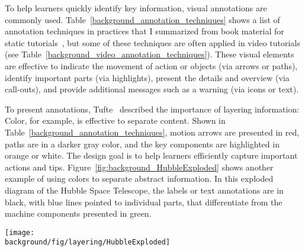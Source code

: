 To help learners quickly identify key information, visual annotations are commonly used. Table~\ref{background_annotation_techniques} shows a list of annotation techniques in practices that I summarized from book material for static tutorials~\cite{mijksenaar1999open,greenberg2012sketching,Buxton:2007:SUE:1526229,tufte1990envisioning}, but some of these techniques are often applied in video tutorials (see Table~\ref{background_video_annotation_techniques}).
%
These visual elements are effective to indicate the movement of action or objects (via arrows or paths), identify important parts (via highlights), present the details and overview (via call-outs), and provide additional messages such as a warning (via icons or text).

To present annotations, Tufte~\cite{tufte1990envisioning} described the importance of layering information: 
%
Color, for example, is effective to separate content. Shown in Table~\ref{background_annotation_techniques}, motion arrows are presented in red, paths are in a darker gray color, and the key components are highlighted in orange or white. The design goal is to help learners efficiently capture important actions and tips.
%
Figure~\ref{fig:background_HubbleExploded} shows another example of using colors to separate abstract information. In this exploded diagram of the Hubble Space Telescope, the labels or text annotations are in black, with blue lines pointed to individual parts, that differentiate from the machine components presented in green.

\begin{figure*}[th!]
  \centering
  \texttt{[image: \\background/fig/layering/HubbleExploded]}
  \caption{Color can differentiate between annotation (labels in black) and annotated information (parts in green in this diagram). Image by AndrewBuck (Own work), licensed under CC BY-SA 3.0.
  }
  \label{fig:background_HubbleExploded}
\end{figure*}



